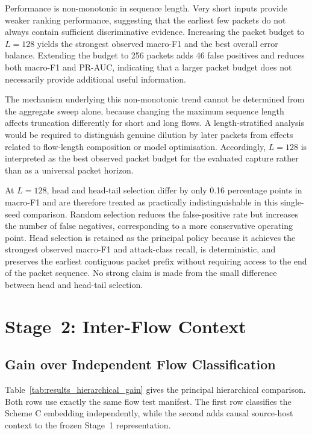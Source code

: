 \documentclass[11pt,fleqn]{report}
\begin{document}
Performance is non-monotonic in sequence length. Very short inputs provide weaker ranking performance, suggesting that the earliest few packets do not always contain sufficient discriminative evidence. Increasing the packet budget to $L=128$ yields the strongest observed macro-F1 and the best overall error balance. Extending the budget to 256 packets adds 46 false positives and reduces both macro-F1 and PR-AUC, indicating that a larger packet budget does not necessarily provide additional useful information.

The mechanism underlying this non-monotonic trend cannot be determined from the aggregate sweep alone, because changing the maximum sequence length affects truncation differently for short and long flows. A length-stratified analysis would be required to distinguish genuine dilution by later packets from effects related to flow-length composition or model optimisation. Accordingly, $L=128$ is interpreted as the best observed packet budget for the evaluated capture rather than as a universal packet horizon.

At $L=128$, head and head-tail selection differ by only 0.16 percentage points in macro-F1 and are therefore treated as practically indistinguishable in this single-seed comparison. Random selection reduces the false-positive rate but increases the number of false negatives, corresponding to a more conservative operating point. Head selection is retained as the principal policy because it achieves the strongest observed macro-F1 and attack-class recall, is deterministic, and preserves the earliest contiguous packet prefix without requiring access to the end of the packet sequence. No strong claim is made from the small difference between head and head-tail selection.

\section{Stage~2: Inter-Flow Context}
\label{subsec:results_stage2}

\subsection{Gain over Independent Flow Classification}
\label{subsubsec:results_hierarchical_gain}

Table~\ref{tab:results_hierarchical_gain} gives the principal hierarchical comparison. Both rows use exactly the same flow test manifest. The first row classifies the Scheme C embedding independently, while the second adds causal source-host context to the frozen Stage~1 representation.
\end{document}
